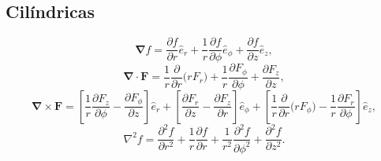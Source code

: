 \documentclass[12pt,oneside,a4paper]{abntex2}
\begin{document}
\subsection*{Cilíndricas}
\begin{equation*}
\bm{\nabla} f = \frac{\partial f}{\partial r} \hat{e}_r +  \frac{1}{r} \frac{\partial f}{\partial \phi} \hat{e}_\phi + \frac{\partial f}{\partial z} \hat{e}_z,
\end{equation*}
\begin{equation*}
\bm{\nabla} \cdot \bm{F} = \frac{1}{r}  \frac{\partial }{\partial r} \Big( r F_r \Big)+ \frac{1}{r} \frac{\partial F_\phi}{\partial \phi} +  \frac{\partial F_z}{\partial z} ,
\end{equation*} 
\begin{equation*}
\bm{\nabla} \times \bm{F} =  \left[\frac{1}{r} \frac{\partial F_z}{\partial \phi} - \frac{\partial F_\phi}{\partial z} \right]  \hat{e}_r + \left[  \frac{\partial F_r}{\partial z} -  \frac{\partial F_z}{\partial r}  \right] \hat{e}_\phi + \left[ \frac{1}{r} \frac{\partial}{\partial r}\Big( r F_\phi \Big) - \frac{1}{r} \frac{\partial F_r}{\partial \phi}  \right] \hat{e}_z,
\end{equation*} 
\begin{equation*}
\nabla^2 f = \frac{\partial^2 f}{\partial r^2} + \frac{1}{r} \frac{\partial f}{\partial r} + \frac{1}{r^2} \frac{\partial^2 f}{\partial \phi^2}  + \frac{\partial^2 f}{\partial z^2} .
\end{equation*}
\end{document}
